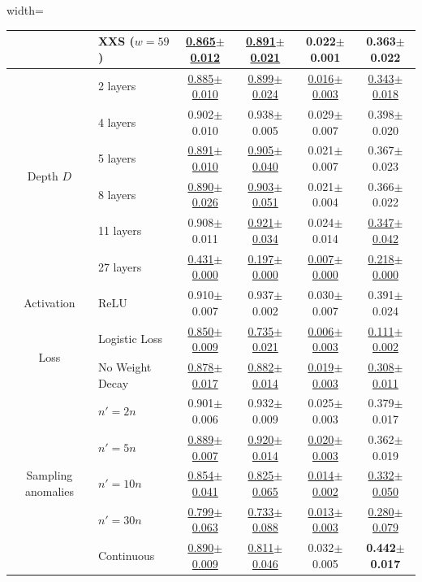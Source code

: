 \documentclass{article}
\begin{document}
\begin{table}[]
\begin{adjustbox}{width=\textwidth}
\begin{tabular}{cl|cccc}
& XXS ($w=59$) & \underline{0.865$\pm$0.012} & \underline{0.891$\pm$0.021} & 0.022$\pm$0.001 & 0.363$\pm$0.022 \\
\midrule
\multirow{6}{*}{Depth $D$}  & 2 layers & \underline{0.885$\pm$0.010} & \underline{0.899$\pm$0.024} & \underline{0.016$\pm$0.003} & \underline{0.343$\pm$0.018} \\
 & 4 layers & 0.902$\pm$0.010 & 0.938$\pm$0.005 & 0.029$\pm$0.007 & 0.398$\pm$0.020 \\
 & 5 layers & \underline{0.891$\pm$0.010} & \underline{0.905$\pm$0.040} & 0.021$\pm$0.007 & 0.367$\pm$0.023 \\
 & 8 layers & \underline{0.890$\pm$0.026} & \underline{0.903$\pm$0.051} & 0.021$\pm$0.004 & 0.366$\pm$0.022 \\
 & 11 layers & 0.908$\pm$0.011 & \underline{0.921$\pm$0.034} & 0.024$\pm$0.014 & \underline{0.347$\pm$0.042} \\
& 27 layers & \underline{0.431$\pm$0.000} & \underline{0.197$\pm$0.000} & \underline{0.007$\pm$0.000} & \underline{0.218$\pm$0.000} \\
\midrule
Activation & ReLU & 0.910$\pm$0.007 & 0.937$\pm$0.002 & 0.030$\pm$0.007 & 0.391$\pm$0.024 \\
\midrule
\multirow{2}{*}{Loss} & Logistic Loss & \underline{0.850$\pm$0.009} & \underline{0.735$\pm$0.021} & \underline{0.006$\pm$0.003} & \underline{0.111$\pm$0.002}\\
 & No Weight Decay & \underline{0.878$\pm$0.017} & \underline{0.882$\pm$0.014} & \underline{0.019$\pm$0.003} & \underline{0.308$\pm$0.011} \\
\midrule
\multirow{5}{*}{Sampling anomalies} & $n'=2n$ & 0.901$\pm$0.006 & 0.932$\pm$0.009 & 0.025$\pm$0.003 & 0.379$\pm$0.017 \\
& $n'=5n$ & \underline{0.889$\pm$0.007} & \underline{0.920$\pm$0.014} & \underline{0.020$\pm$0.003} & 0.362$\pm$0.019 \\
& $n'=10n$ & \underline{0.854$\pm$0.041} & \underline{0.825$\pm$0.065} & \underline{0.014$\pm$0.002} & \underline{0.332$\pm$0.050} \\
& $n'=30n$ & \underline{0.799$\pm$0.063} & \underline{0.733$\pm$0.088} & \underline{0.013$\pm$0.003} & \underline{0.280$\pm$0.079} \\
 & Continuous & \underline{0.890$\pm$0.009} & \underline{0.811$\pm$0.046} & 0.032$\pm$0.005 & \bf{0.442$\bm \pm$0.017} \\


\end{tabular}
\end{adjustbox}
\end{table}
\end{document}
